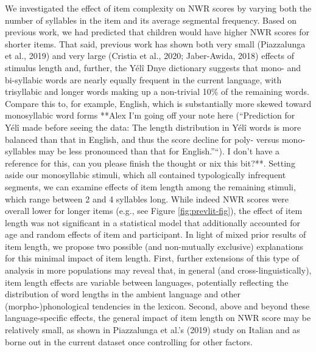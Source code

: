 \documentclass[english,,man,floatsintext]{apa6}
\begin{document}
We investigated the effect of item complexity on NWR scores by varying
both the number of syllables in the item and its average segmental
frequency. Based on previous work, we had predicted that children would
have higher NWR scores for shorter items. That said, previous work has
shown both very small (Piazzalunga et al., 2019) and very large (Cristia
et al., 2020; Jaber-Awida, 2018) effects of stimulus length and,
further, the Yélî Dnye dictionary suggests that mono- and bi-syllabic
words are nearly equally frequent in the current language, with
trisyllabic and longer words making up a non-trivial 10\% of the
remaining words. Compare this to, for example, English, which is
substantially more skewed toward monosyllabic word forms **Alex I'm
going off your note here (``Prediction for Yélî made before seeing the
data: The length distribution in Yélî words is more balanced than that
in English, and thus the score decline for poly- versus mono-syllables
may be less pronounced than that for English.''``). I don't have a
reference for this, can you please finish the thought or nix this
bit?**. Setting aside our monosyllabic stimuli, which all contained
typologically infrequent segments, we can examine effects of item length
among the remaining stimuli, which range between 2 and 4 syllables long.
While indeed NWR scores were overall lower for longer items (e.g., see
Figure \ref{fig:prevlit-fig}), the effect of item length was not
significant in a statistical model that additionally accounted for age
and random effects of item and participant. In light of mixed prior
results of item length, we propose two possible (and non-mutually
exclusive) explanations for this minimal impact of item length. First,
further extensions of this type of analysis in more populations may
reveal that, in general (and cross-linguistically), item length effects
are variable between languages, potentially reflecting the distribution
of word lengths in the ambient language and other (morpho-)phonological
tendencies in the lexicon. Second, above and beyond these
language-specific effects, the general impact of item length on NWR
score may be relatively small, as shown in Piazzalunga et al.'s (2019)
study on Italian and as borne out in the current dataset once
controlling for other factors.
\end{document}
